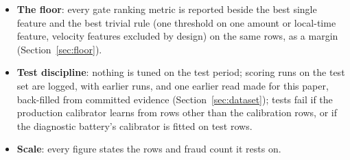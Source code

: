 \begin{itemize}
        (Section~\ref{sec:evaluation}). The other intervals treat rows as independent and are
        narrower than they should be by an amount not measured, except where each row is on its own
        account (as for the reversal variant): those of the earlier-draw
        battery and its variant recalls, the Hanley--McNeil column of the floor's re-run, the
        row-bootstrap intervals of the full-volume model's own evidence file and of PB-66's
        monthly and precision--recall rows, and the Wilson intervals of the fairness table and
        of leave-one-fraud-type-out, and the diagnostic model's per-channel AUC intervals
        in the evidence files. The alert-budget table's precision intervals resample whole
        days, neither accounts nor rows; its recall intervals are bootstrapped, but their resampling
        unit is not recorded in the evidence file.
  \item \textbf{The floor}: every gate ranking metric is reported beside the best single feature and
        the best trivial rule (one threshold on one amount or local-time feature, velocity features
        excluded by design) on the same rows, as a margin
        (Section~\ref{sec:floor}).
  \item \textbf{Test discipline}: nothing is tuned on the test period; scoring runs on the test
        set are logged, with earlier runs, and one earlier read made for this paper, back-filled
        from committed evidence (Section~\ref{sec:dataset}); tests fail if the production calibrator
        learns from rows other than the calibration rows, or if the diagnostic battery's calibrator
        is fitted on test rows.
  \item \textbf{Scale}: every figure states the rows and fraud count it rests on.
\end{itemize}
